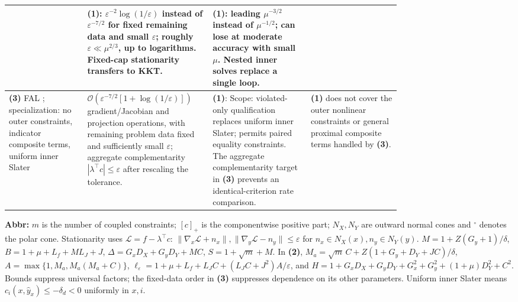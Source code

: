 \begin{table}[tp]
\begin{threeparttable}
\begin{tabularx}{\linewidth}{@{}>{\raggedright\arraybackslash}p{0.20\linewidth}>{\raggedright\arraybackslash}p{0.32\linewidth}>{\raggedright\arraybackslash}p{0.25\linewidth}>{\raggedright\arraybackslash}X@{}}
& \textbf{(1)}: $\varepsilon^{-2}\log(1/\varepsilon)$ instead of $\varepsilon^{-7/2}$ for fixed remaining data and small $\varepsilon$; roughly $\varepsilon\ll\mu^{2/3}$, up to logarithms. Fixed-cap stationarity transfers to KKT.
& \textbf{(1)}: leading $\mu^{-3/2}$ instead of $\mu^{-1/2}$; can lose at moderate accuracy with small $\mu$. Nested inner solves replace a single loop. \\
\midrule
\textbf{(3)} FAL \citep[Theorem 2, Remark 6(ii)]{cscmLuMeiV2Verified}; specialization: no outer constraints, indicator composite terms, uniform inner Slater
& $\mathcal{O}\!\left(\varepsilon^{-7/2}[1+\log(1/\varepsilon)]\right)$ gradient/Jacobian and projection operations, with remaining problem data fixed and sufficiently small $\varepsilon$; aggregate complementarity $|\lambda^\top c|\le\varepsilon$ after rescaling the tolerance.
& \textbf{(1)}: Scope: violated-only qualification replaces uniform inner Slater; permits paired equality constraints. The aggregate complementarity target in \textbf{(3)} prevents an identical-criterion rate comparison.
& \textbf{(1)} does not cover the outer nonlinear constraints or general proximal composite terms handled by \textbf{(3)}. \\
\bottomrule
\end{tabularx}
\begin{tablenotes}[flushleft]\footnotesize
\item[] \textbf{Abbr:} $m$ is the number of coupled constraints; $[c]_+$ is the componentwise positive part; $N_X,N_Y$ are outward normal cones and ${}^\circ$ denotes the polar cone. Stationarity uses $\mathcal{L}=f-\lambda^\top c$: $\|\nabla_x\mathcal{L}+n_x\|,\|\nabla_y\mathcal{L}-n_y\|\le\varepsilon$ for $n_x\in N_X(x),n_y\in N_Y(y)$. $M=1+Z(G_y+1)/\delta$, $B=1+\mu+L_f+ML_J+J$, $\Delta=G_xD_X+G_yD_Y+MC$, $S=1+\sqrt m+M$. In \textbf{(2)}, $M_a=\sqrt m\,C+Z(1+G_y+D_Y+JC)/\delta$, $A=\max\{1,M_a,M_a(M_a+C)\}$, $\ell_\varepsilon=1+\mu+L_f+L_JC+(L_JC+J^2)A/\varepsilon$, and $H=1+G_xD_X+G_yD_Y+G_x^2+G_y^2+(1+\mu)D_Y^2+C^2$. Bounds suppress universal factors; the fixed-data order in \textbf{(3)} suppresses dependence on its other parameters. Uniform inner Slater means $c_i(x,\widehat y_x)\le-\delta_d<0$ uniformly in $x,i$.
\end{tablenotes}
\end{threeparttable}
\end{table}
\clearpage
